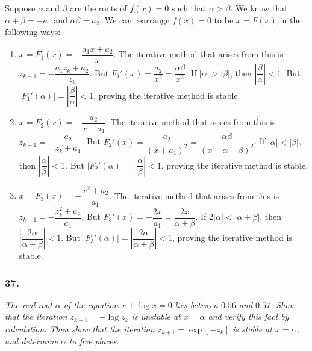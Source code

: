 \documentclass[12pt]{article}
\begin{document}
\noindent Suppose $\alpha$ and $\beta$ are the roots of $f(x) = 0$ such that $\alpha > \beta$.  We know that $\alpha + \beta = -a_1$ and $\alpha\beta = a_2$.  We can rearrange $f(x) = 0$ to be $x = F(x)$ in the following ways:
\begin{enumerate}[\ \ 1)\ \ ]
\item $x = F_1(x) = -\dfrac{a_1x + a_2}{x}$.  The iterative method that arises from this is $z_{k+1} = -\dfrac{a_1z_k + a_2}{z_k}$.  But $F_1'(x)  = \dfrac{a_2}{x^2} = \dfrac{\alpha\beta}{x^2}$.  If $|\alpha| > |\beta|$, then $\left|\dfrac{\beta}{\alpha}\right| < 1$.  But $|F_1'(\alpha)| = \left|\dfrac{\beta}{\alpha}\right| < 1$, proving the iterative method is stable.
\item $x = F_2(x) = -\dfrac{a_2}{x + a_1}$.  The iterative method that arises from this is $z_{k+1} = -\dfrac{a_2}{z_k + a_1}$.  But $F_2'(x)  = \dfrac{a_2}{(x+a_1)^2} = \dfrac{\alpha\beta}{(x - \alpha - \beta)^2}$.  If $|\alpha| < |\beta|$, then $\left|\dfrac{\alpha}{\beta}\right| < 1$.  But $|F_2'(\alpha)| = \left|\dfrac{\alpha}{\beta}\right| < 1$, proving the iterative method is stable.
\item $x = F_3(x) = -\dfrac{x^2 + a_2}{a_1}$.  The iterative method that arises from this is $z_{k+1} = -\dfrac{z_k^2 + a_2}{a_1}$.  But $F_3'(x)  = -\dfrac{2x}{a_1} = \dfrac{2x}{\alpha + \beta}$.  If $2|\alpha| < |\alpha + \beta|$, then $\left|\dfrac{2\alpha}{\alpha + \beta}\right| < 1$.  But $|F_3'(\alpha)| = \left|\dfrac{2\alpha}{\alpha + \beta}\right| < 1$, proving the iterative method is stable.
\end{enumerate}

\subsubsection*{37.}
{\it The real root $\alpha$ of the equation $x + \log{x} = 0$ lies between $0.56$ and $0.57$.  Show that the iteration $z_{k+1} = -\log{z_k}$ is unstable at $x = \alpha$ and verify this fact by calculation.  Then show that the iteration $z_{k+1} = \exp[-z_k]$ is stable at $x = \alpha$, and determine $\alpha$ to five places.}
\end{document}
